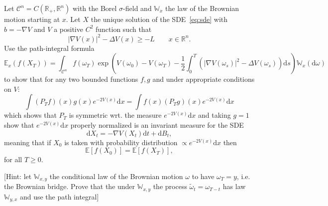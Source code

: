 \documentclass{article}
\newcommand{\mathd}{\mathrm{d}}
\begin{document}
\hrulefill

\begin{exercise}
  [Pts 5] Let $\mathcal{C}^n = C (\mathbb{R}_+, \mathbb{R}^n)$ with the Borel
  $\sigma$-field and $\mathbb{W}_x$ the law of the Brownian motion starting at
  $x$. Let $X$ the unique solution of the SDE~{\eqref{eq:sde}} with $b = -
  \nabla V$ and $V$ a positive $C^2$ function such that
  \[ | \nabla V (x) |^2 - \Delta V (x) \geqslant - L \qquad x \in \mathbb{R}^n
     . \]
  Use the path-integral formula
  \[ \mathbb{E}_x (f (X_T)) = \int_{\mathcal{C}^n} f (\omega_T) \exp \left( V
     (\omega_0) - V (\omega_T) - \frac{1}{2} \int_0^T (| \nabla V (\omega_s)
     |^2 - \Delta V (\omega_s)) \mathd s \right) \mathbb{W}_x (\mathd \omega)
  \]
  to show that for any two bounded functions $f, g$ and under appropriate
  conditions on $V$:
  \[ \int (P_T f) (x) g (x) e^{- 2 V (x)} \mathd x = \int f (x) (P_T g) (x)
     e^{- 2 V (x)} \mathd x \]
  which shows that $P_T$ is symmetric wrt. the measure $e^{- 2 V (x)} \mathd
  x$ and taking $g = 1$ show that $e^{- 2 V (x)} \mathd x$ properly normalized
  is an invariant measure for the SDE
  \[ \mathd X_t = - \nabla V (X_t) \mathd t + \mathd B_t, \]
  meaning that if $X_0$ is taken with probability distribution $\propto e^{- 2
  V (x)} \mathd x$ then
  \[ \mathbb{E} [f (X_0)] =\mathbb{E} [f (X_T)], \]
  for all $T \geqslant 0$.
  
  [Hint: let $\mathbb{W}_{x, y}$ the conditional law of the Brownian motion
  $\omega$ to have $\omega_T = y$, i.e. the Brownian bridge. Prove that the
  under $\mathbb{W}_{x, y}$ the process $\tilde{\omega}_t = \omega_{T - t}$
  has law $\mathbb{W}_{y, x}$ and use the path integral]
\end{exercise}

\hrulefill
\end{document}
